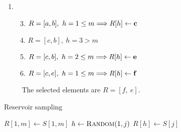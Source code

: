 \begin{enumerate}
  \item \begin{enumerate}[\bf a.]
    \setcounter{enumii}{2}
    \item $R = [a, b],\ h = 1 \le m \Longrightarrow R[h] \gets \text{\bf c}$
    \item $R = [c, b],\ h = 3 > m$
    \item $R = [c, b],\ h = 2 \le m \Longrightarrow R[h] \gets \text{\bf e}$
    \item $R = [c, e],\ h = 1 \le m \Longrightarrow R[h] \gets \text{\bf f}$
  \end{enumerate}\
  The selected elements are $R = [ f,\ e ]$.

\end{enumerate}
%
\begin{algorithm}[h]
\caption{Reservoir sampling}\label{alg:reservoir}
\begin{algorithmic}[1]
\State $R[1, m] \gets S[1, m]$
  \State $h \gets \text{\sc Random}(1, j)$
  \State $R[h] \gets S[j]$
  \EndIf
\EndFor
\end{algorithmic}
\end{algorithm}
